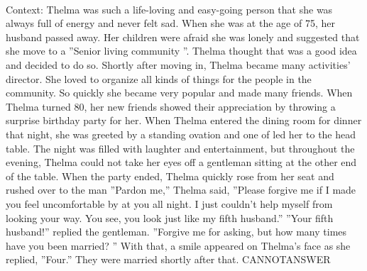 \documentclass[11pt,a4paper, onecolumn]{article}
\begin{document}
\\ Context: Thelma was such a life-loving and easy-going person that she was always full of energy and never felt sad. When she was at the age of 75, her husband passed away. Her children were afraid she was lonely and suggested that she move to a ''Senior living community ''. Thelma thought that was a good idea and decided to do so. Shortly after moving in, Thelma became many activities' director. She loved to organize all kinds of things for the people in the community. So quickly she became very popular and made many friends. When Thelma turned 80, her new friends showed their appreciation by throwing a surprise birthday party for her. When Thelma entered the dining room for dinner that night, she was greeted by a standing ovation and one of   led her to the head table. The night was filled with laughter and entertainment, but throughout the evening, Thelma could not take her eyes off a gentleman sitting at the other end of the table. When the party ended, Thelma quickly rose from her seat and rushed over to the man ''Pardon me,'' Thelma said, ''Please forgive me if I made you feel uncomfortable by   at you all night. I just couldn't help myself from looking your way. You see, you look just like my fifth husband.'' ''Your fifth husband!'' replied the gentleman. ''Forgive me for asking, but how many times have you been married? '' With that, a smile appeared on Thelma's face as she replied, ''Four.'' They were married shortly after that. CANNOTANSWER
\end{document}
